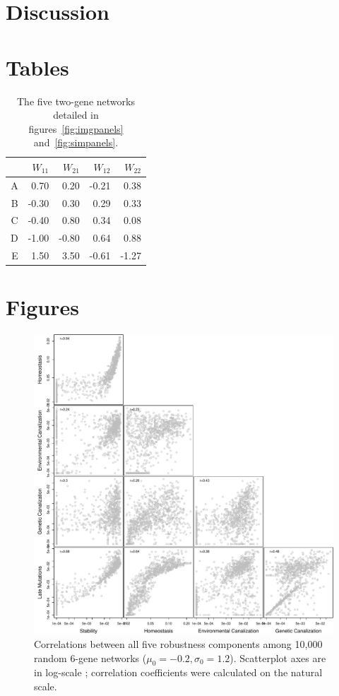 \documentclass{article}
\begin{document}
\section{Discussion}

\printbibliography

\section*{Tables}

\begin{table}[h!]
\centering
\begin{tabular}{rrrrr}
  \hline
 & $W_{11}$ & $W_{21}$ & $W_{12}$ & $W_{22}$ \\ 
  \hline
A & 0.70 & 0.20 & -0.21 & 0.38 \\ 
  B & -0.30 & 0.30 & 0.29 & 0.33 \\ 
  C & -0.40 & 0.80 & 0.34 & 0.08 \\ 
  D & -1.00 & -0.80 & 0.64 & 0.88 \\ 
  E & 1.50 & 3.50 & -0.61 & -1.27 \\ 
   \hline
\end{tabular}
\caption{\label{tab:W} The five two-gene networks detailed in figures~\ref{fig:imgpanels} and~\ref{fig:simpanels}. }
\end{table}

\clearpage
\section*{Figures}
\begin{figure}[h!]
\includegraphics[width=15cm]{figures/R1-1-1b}
\caption{\label{fig:cor} Correlations between all five robustness components among 10,000 random 6-gene networks ($\mu_0=-0.2, \sigma_0=1.2$). Scatterplot axes are in log-scale ; correlation coefficients were calculated on the natural scale. }
\end{figure}
\end{document}
